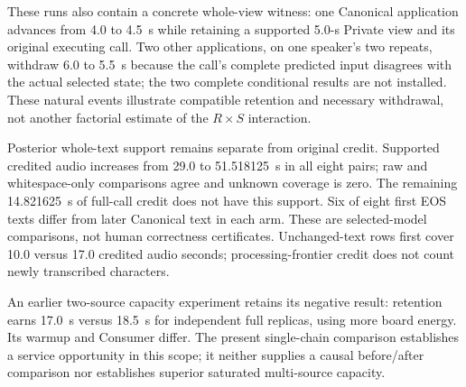 These runs also contain a concrete whole-view witness: one Canonical
application advances from 4.0 to 4.5~s while retaining a supported 5.0-s
Private view and its original executing call. Two other applications,
on one speaker's two repeats, withdraw 6.0 to 5.5~s because the call's
complete predicted input disagrees with the actual selected state;
the two complete conditional results are not installed. These natural
events illustrate compatible retention and necessary withdrawal, not
another factorial estimate of the $R\times S$ interaction.

Posterior whole-text support remains separate from original credit.
Supported credited audio increases from 29.0 to 51.518125~s in all eight
pairs; raw and whitespace-only comparisons agree and unknown coverage
is zero. The remaining 14.821625~s of full-call credit does not have this
support. Six of eight first EOS texts differ from later Canonical text
in each arm. These are selected-model comparisons, not human correctness
certificates. Unchanged-text rows first
cover 10.0 versus 17.0 credited audio seconds; processing-frontier credit
does not count newly transcribed characters.

An earlier two-source capacity experiment retains its negative result:
retention earns 17.0~s versus 18.5~s for independent full replicas, using
more board energy. Its warmup and Consumer differ. The present
single-chain comparison establishes a service opportunity in this scope;
it neither supplies a causal before/after comparison nor establishes
superior saturated multi-source capacity.
